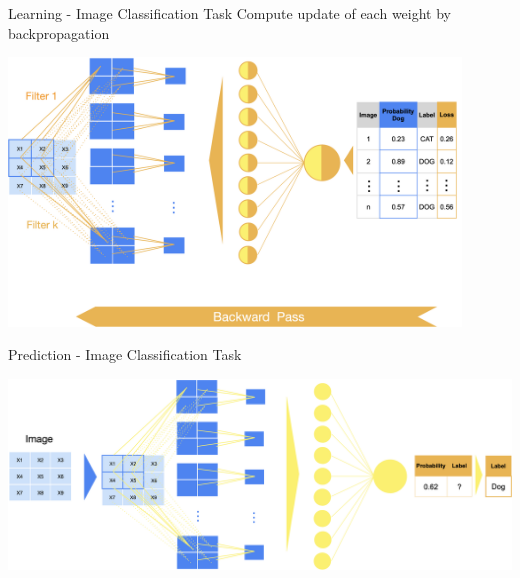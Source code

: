 \documentclass[11pt,compress,t,notes=noshow, xcolor=table]{beamer}
\begin{document}
\begin{vbframe}{Learning - Image Classification Task}
\small Compute update of each weight by backpropagation
\vspace{0.5cm}
\begin{center}
   \includegraphics[width = 0.9\textwidth]{figure_man/nutshell-nn-learning-backpropagation.png}    
\end{center}    
\end{vbframe}



\begin{vbframe}{Prediction - Image Classification Task}
\vspace{0.5cm}
\begin{center}
   \includegraphics[width = \textwidth]{figure_man/nutshell-nn-prediction.png}    
\end{center}

\end{vbframe}
\end{document}
